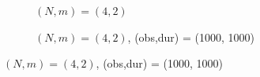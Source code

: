 \documentclass[12pt]{article}
\begin{document}
\begin{figure}
	\begin{subfigure}{.47\textwidth}
		\centering
		\caption{\((N,m)=(4,2)\)}
		\label{fig:N4m2}
	\end{subfigure}%
	\quad
	\begin{subfigure}{.47\textwidth}
		\centering
		\caption{\((N,m)=(4,2)\), (obs,dur) = (1000, 1000)}
		\label{fig:N4m3_1e3}
	\end{subfigure} %
		

\end{figure}
\end{document}
